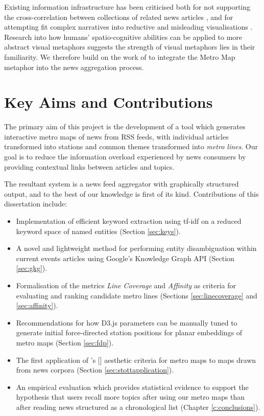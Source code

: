 Existing information infrastructure has been criticised both for not supporting the cross-correlation between collections of related news articles \citep{GalaxyOfNews}, and for attempting fit complex narratives into reductive and misleading visualisations \citep{InformationCartography}. Research into how humans' spatio-cognitive abilities can be applied to more abstract visual metaphors \citep{FromMetaphorToMethod} suggests the strength of visual metaphors lies in their familiarity. We therefore build on the work of \cite{GeneratingInformationMaps} to integrate the Metro Map metaphor into the news aggregation process.

\section*{Key Aims and Contributions}
The primary aim of this project is the development of a tool which generates interactive metro maps of news from RSS feeds, with individual articles transformed into stations and common themes transformed into \textit{metro lines}. Our goal is to reduce the information overload experienced by news consumers by providing contextual links between articles and topics.

The resultant system is a news feed aggregator with graphically structured output, and to the best of our knowledge is first of its kind. Contributions of this dissertation include:\vspace{-0.3cm}
\begin{itemize}[itemsep=0.1em]
	\item Implementation of efficient keyword extraction using tf-idf \citep{tfidf} on a reduced keyword space of named entities (Section \ref{sec:keys}).
	\item A novel and lightweight method for performing entity disambiguation within current events articles using Google's Knowledge Graph API (Section \ref{sec:gkg}).
	\item Formalisation of the metrics \textit{Line Coverage} and \textit{Affinity} as criteria for evaluating and ranking candidate metro lines (Sections \ref{sec:linecoverage} and \ref{sec:affinity}).
	\item Recommendations for how D3.js parameters can be manually tuned to generate initial force-directed station positions for planar embeddings of metro maps (Section \ref{sec:fdp}).
	\item The first application of \citeauthor{AutomaticMetroMapLayoutThesis}'s [\citeyear{AutomaticMetroMapLayoutThesis, AutomaticMetroMapLayout}] aesthetic criteria for metro maps to maps drawn from news corpora (Section \ref{sec:stottapplication}).
	\item An empirical evaluation which provides statistical evidence to support the hypothesis that users recall more topics after using our metro maps than after reading news structured as a chronological list (Chapter \ref{c:conclusions}). 
\end{itemize}
 

